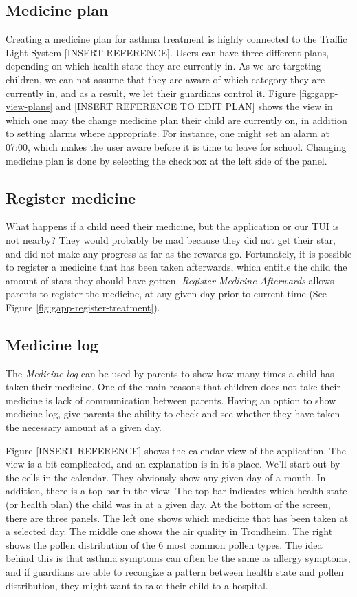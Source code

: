 \subsection{Medicine plan}
\label{sec:description-medicine-plan}
Creating a medicine plan for asthma treatment is highly connected to the Traffic Light System [INSERT REFERENCE].
Users can have three different plans, depending on which health state they are currently in. As we are targeting children, we can not assume that they are aware of which category they are currently in, and as a result, we let their guardians control it. Figure \ref{fig:gapp-view-plans} and [INSERT REFERENCE TO EDIT PLAN] shows the view in which one may the change medicine plan their child are currently on, in addition to setting alarms where appropriate. For instance, one might set an alarm at 07:00, which makes the user aware before it is time to leave for school. Changing medicine plan is done by selecting the checkbox at the left side of the panel.  

\subsection{Register medicine}
\label{sec:description-register-medicine}
What happens if a child need their medicine, but the application or our TUI is not nearby? They would probably be mad because they did not get their star, and did not make any progress as far as the rewards go. Fortunately, it is possible to register a medicine that has been taken afterwards, which entitle the child the amount of stars they should have gotten. \emph{Register Medicine Afterwards} allows parents to register the medicine, at any given day prior to current time (See Figure \ref{fig:gapp-register-treatment}).  


\subsection{Medicine log}
\label{sec:description-medicine-log}
The \emph{Medicine log} can be used by parents to show how many times a child has taken their medicine. One of the main reasons that children does not take their medicine is lack of communication between parents. Having an option to show medicine log, give parents the ability to check and see whether they have taken the necessary amount at a given day.

Figure [INSERT REFERENCE] shows the calendar view of the application. The view is a bit complicated, and an explanation is in it's place. We'll start out by the cells in the calendar. They obviously show any given day of a month. In addition, there is a top bar in the view. The top bar indicates which health state (or health plan) the child was in at a given day. At the bottom of the screen, there are three panels. The left one shows which medicine that has been taken at a selected day. The middle one shows the air quality in Trondheim. The right shows the pollen distribution of the 6 most common pollen types. The idea behind this is that asthma symptoms can often be the same as allergy symptoms, and if guardians are able to recongize a pattern between health state and pollen distribution, they might want to take their child to a hospital.   
 
